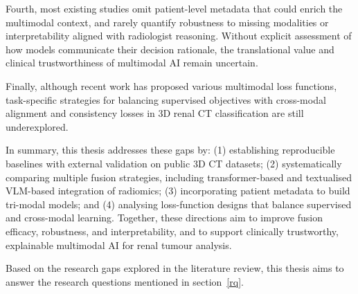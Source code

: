 Fourth, most existing studies omit patient-level metadata that could enrich the multimodal context, and rarely quantify robustness to missing modalities or interpretability aligned with radiologist reasoning. Without explicit assessment of how models communicate their decision rationale, the translational value and clinical trustworthiness of multimodal AI remain uncertain.

Finally, although recent work has proposed various multimodal loss functions, task-specific strategies for balancing supervised objectives with cross-modal alignment and consistency losses in 3D renal CT classification are still underexplored.

In summary, this thesis addresses these gaps by: (1) establishing reproducible baselines with external validation on public 3D CT datasets; (2) systematically comparing multiple fusion strategies, including transformer-based and textualised VLM-based integration of radiomics; (3) incorporating patient metadata to build tri-modal models; and (4) analysing loss-function designs that balance supervised and cross-modal learning. Together, these directions aim to improve fusion efficacy, robustness, and interpretability, and to support clinically trustworthy, explainable multimodal AI for renal tumour analysis.

Based on the research gaps explored in the literature review, this thesis aims to answer the  research questions mentioned in section~\ref{rq}.
